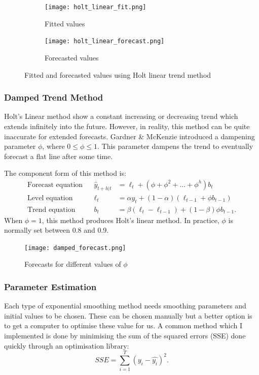 \documentclass{article}
\begin{document}
  \begin{figure}[H]
    \centering
    \captionsetup{justification=centering}
    \begin{subfigure}[b]{0.49\linewidth}
      \texttt{[image: holt\_linear\_fit.png]}
      \caption{Fitted values}
    \end{subfigure}
    \begin{subfigure}[b]{0.49\linewidth}
      \texttt{[image: holt\_linear\_forecast.png]}
      \caption{Forecasted values}
    \end{subfigure}
    \caption{Fitted and forecasted values using Holt linear trend method}
  \end{figure}

  \subsubsection*{Damped Trend Method}
  Holt's Linear method show a constant increasing or decreasing trend which extends infinitely into the future. However, in reality, this method can be quite inaccurate for extended forecasts. Gardner \& McKenzie introduced a dampening parameter $\phi$, where $0 \le \phi \le 1$. This parameter dampens the trend to eventually forecast a flat line after some time.

  The component form of this method is:
  \begin{align*}
    \text{Forecast equation}&& \hat{y}_{t+h|t} &= \ell_{t} + (\phi+\phi^2+...+\phi^h)b_{t} \\
    \text{Level equation}   && \ell_{t} &= \alpha y_{t} + (1 - \alpha)(\ell_{t-1} + \phi b_{t-1})\\
    \text{Trend equation}   && b_{t}    &= \beta(\ell_{t} - \ell_{t-1}) + (1 -\beta)\phi b_{t-1}.
  \end{align*}
  When $\phi=1$, this method produces Holt's linear method. In practice, $\phi$ is normally set between 0.8 and 0.9.

  \begin{figure}[H]
    \centering
    \captionsetup{justification=centering}
    \texttt{[image: damped\_forecast.png]}
    \caption{Forecasts for different values of $\phi$}
  \end{figure}

  \subsubsection{Parameter Estimation}
  Each type of exponential smoothing method needs smoothing parameters and initial values to be chosen. These can be chosen manually but a better option is to get a computer to optimise these value for us. A common method which I implemented is done by minimising the sum of the squared errors (SSE) done quickly through an optimisation library:
  \begin{equation*}
    SSE = \sum^{T}_{i=1}\left(y_i - \hat{y_i}\right)^2.
  \end{equation*}
\end{document}
